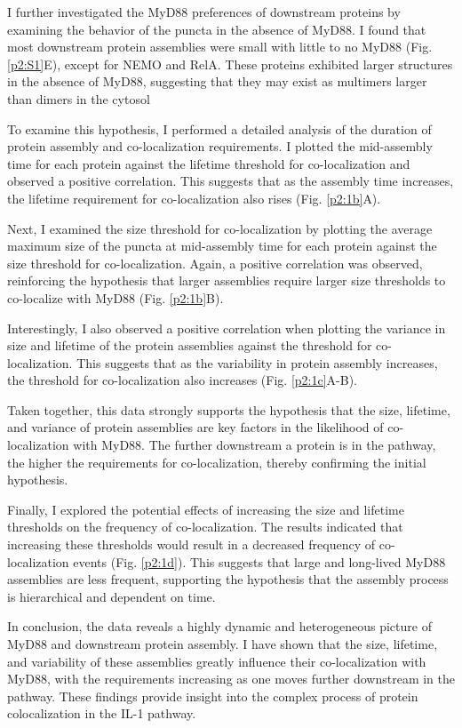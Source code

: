 I further investigated the MyD88 preferences of downstream proteins by examining the behavior of the puncta in the absence of MyD88. I found that most downstream protein assemblies were small with little to no MyD88 (Fig. \ref{p2:S1}E), except for NEMO and RelA. These proteins exhibited larger structures in the absence of MyD88, suggesting that they may exist as multimers larger than dimers in the cytosol

To examine this hypothesis, I performed a detailed analysis of the duration of protein assembly and co-localization requirements. I plotted the mid-assembly time for each protein against the lifetime threshold for co-localization and observed a positive correlation. This suggests that as the assembly time increases, the lifetime requirement for co-localization also rises (Fig. \ref{p2:1b}A).

Next, I examined the size threshold for co-localization by plotting the average maximum size of the puncta at mid-assembly time for each protein against the size threshold for co-localization. Again, a positive correlation was observed, reinforcing the hypothesis that larger assemblies require larger size thresholds to co-localize with MyD88 (Fig. \ref{p2:1b}B).

Interestingly, I also observed a positive correlation when plotting the variance in size and lifetime of the protein assemblies against the threshold for co-localization. This suggests that as the variability in protein assembly increases, the threshold for co-localization also increases (Fig. \ref{p2:1c}A-B).

Taken together, this data strongly supports the hypothesis that the size, lifetime, and variance of protein assemblies are key factors in the likelihood of co-localization with MyD88. The further downstream a protein is in the pathway, the higher the requirements for co-localization, thereby confirming the initial hypothesis.

Finally, I explored the potential effects of increasing the size and lifetime thresholds on the frequency of co-localization. The results indicated that increasing these thresholds would result in a decreased frequency of co-localization events (Fig. \ref{p2:1d}). This suggests that large and long-lived MyD88 assemblies are less frequent, supporting the hypothesis that the assembly process is hierarchical and dependent on time.

In conclusion, the data reveals a highly dynamic and heterogeneous picture of MyD88 and downstream protein assembly. I have shown that the size, lifetime, and variability of these assemblies greatly influence their co-localization with MyD88, with the requirements increasing as one moves further downstream in the pathway. These findings provide insight into the complex process of protein colocalization in the IL-1 pathway.


